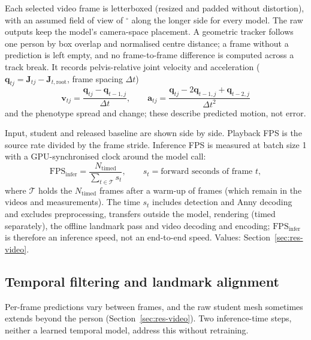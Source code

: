 Each selected video frame is letterboxed (resized and padded without distortion), with an assumed field of view of \VideoFov$^\circ$ along the longer side for every
model. The raw outputs keep the model's camera-space placement. A geometric
tracker follows one person by box overlap and normalised centre distance; a frame without a prediction is left empty,
and no frame-to-frame difference is computed across a track break. It records pelvis-relative joint velocity and
acceleration ($\mathbf q_{tj}=\mathbf J_{tj}-\mathbf J_{t,\mathrm{root}}$, frame spacing $\Delta t$)
\begin{equation}
 \mathbf v_{tj}=\frac{\mathbf q_{tj}-\mathbf q_{t-1,j}}{\Delta t},\qquad
 \mathbf a_{tj}=\frac{\mathbf q_{tj}-2\mathbf q_{t-1,j}+\mathbf q_{t-2,j}}{\Delta t^2}
\label{eq:video-motion}
\end{equation}
and the phenotype spread and change; these describe predicted motion, not error.

Input, student and released baseline are shown side by side. Playback FPS is the source rate divided by the frame
stride. Inference FPS is measured at batch size 1 with a GPU-synchronised clock around the
model call:
\begin{equation}
 \mathrm{FPS}_{\mathrm{infer}}=\frac{N_{\mathrm{timed}}}
 {\sum_{t\in\mathcal T}s_t},\qquad
 s_t=\text{forward seconds of frame } t ,
\label{eq:video-fps}
\end{equation}
where $\mathcal T$ holds the $N_{\mathrm{timed}}$ frames after a warm-up of \VideoWarmupFrames{} frames (which remain
in the videos and measurements). The time $s_t$ includes detection and Anny decoding and excludes
preprocessing, transfers outside the model, rendering (timed separately), the offline landmark pass and video decoding
and encoding; $\mathrm{FPS}_{\mathrm{infer}}$ is therefore an inference speed, not an end-to-end speed. Values:
Section~\ref{sec:res-video}.

\subsection{Temporal filtering and landmark alignment}
\label{sec:method-temporal}

Per-frame predictions vary between frames, and the raw student mesh sometimes extends beyond the person
(Section~\ref{sec:res-video}). Two inference-time steps, neither a learned temporal model, address this without
retraining.

